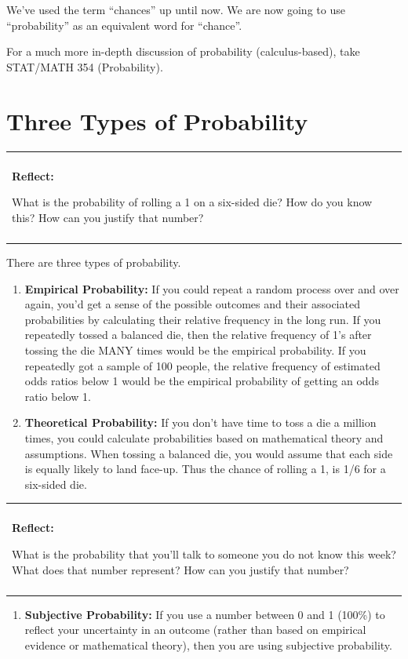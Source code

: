 \documentclass[
]{book}
\providecommand{\tightlist}{%
  \setlength{\itemsep}{0pt}\setlength{\parskip}{0pt}}
\newenvironment{reflect}
{
    \begin{center}
    
    \begin{tabular}{|p{0.8\textwidth}|}
    \rowcolor{LightBlue}
    \hline\\
    \rowcolor{LightBlue}
    \textbf{Reflect:}
}
{
    \\\rowcolor{LightBlue}
    \\\hline
    \end{tabular} 
    \end{center}
}
\begin{document}
We've used the term ``chances'' up until now. We are now going to use ``probability'' as an equivalent word for ``chance''.

For a much more in-depth discussion of probability (calculus-based), take STAT/MATH 354 (Probability).

\section{Three Types of Probability}\label{three-types-of-probability}

\begin{reflect}
What is the probability of rolling a 1 on a six-sided die? How do you
know this? How can you justify that number?
\end{reflect}

There are three types of probability.

\begin{enumerate}
\def\labelenumi{\arabic{enumi}.}
\item
  \textbf{Empirical Probability:} If you could repeat a random process over and over again, you'd get a sense of the possible outcomes and their associated probabilities by calculating their relative frequency in the long run. If you repeatedly tossed a balanced die, then the relative frequency of 1's after tossing the die MANY times would be the empirical probability. If you repeatedly got a sample of 100 people, the relative frequency of estimated odds ratios below 1 would be the empirical probability of getting an odds ratio below 1.
\item
  \textbf{Theoretical Probability:} If you don't have time to toss a die a million times, you could calculate probabilities based on mathematical theory and assumptions. When tossing a balanced die, you would assume that each side is equally likely to land face-up. Thus the chance of rolling a 1, is 1/6 for a six-sided die.
\end{enumerate}

\begin{reflect}
What is the probability that you'll talk to someone you do not know this
week? What does that number represent? How can you justify that number?
\end{reflect}

\begin{enumerate}
\def\labelenumi{\arabic{enumi}.}
\setcounter{enumi}{2}
\tightlist
\item
  \textbf{Subjective Probability:} If you use a number between 0 and 1 (100\%) to reflect your uncertainty in an outcome (rather than based on empirical evidence or mathematical theory), then you are using subjective probability.
\end{enumerate}
\end{document}
